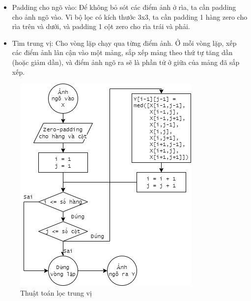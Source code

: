 \begin{itemize}
    \item Padding cho ngõ vào: Để không bỏ sót các điểm ảnh ở rìa, ta cần padding cho ảnh ngõ vào. Vì bộ lọc có kích thước 3x3, ta cần padding 1 hàng zero cho rìa trên và dưới, và padding 1 cột zero cho rìa trái và phải.

    \item Tìm trung vị: Cho vòng lặp chạy qua từng điểm ảnh. Ở mỗi vòng lặp, xếp các điểm ảnh lân cận vào một mảng, sắp xếp mảng theo thứ tự tăng dần (hoặc giảm dần), và điểm ảnh ngõ ra sẽ là phần tử ở giữa của mảng đã sắp xếp.
\end{itemize}

\begin{figure}[h]
    \centering
    \includegraphics[width=.75\linewidth]{images/median_filtering_algorithm.png}
    \caption{Thuật toán lọc trung vị}
    \label{fig:median_filtering_algorithm}
\end{figure}

